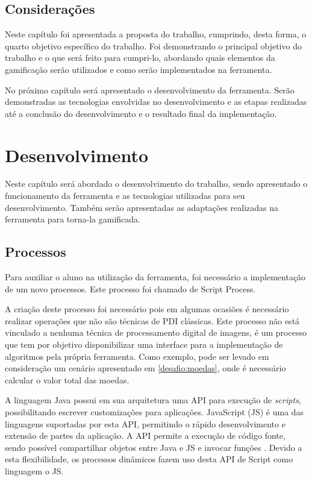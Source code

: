\documentclass[
	12pt,				%
	oneside,			%
	a4paper,			%
	english,			%
	french,				%
	spanish,			%
	brazil,				%
	]{abntex2}
\begin{document}
\section{Considerações}

Neste capítulo foi apresentada a proposta do trabalho, cumprindo, desta forma, o quarto objetivo específico do trabalho. Foi demonstrando o principal objetivo do trabalho e o que será feito para cumpri-lo, abordando quais elementos da gamificação serão utilizados e como serão implementados na ferramenta.

No próximo capítulo será apresentado o desenvolvimento da ferramenta. Serão demonstradas as tecnologias envolvidas no desenvolvimento e as etapas realizadas até a conclusão do desenvolvimento e o resultado final da implementação.

\chapter{Desenvolvimento} 


Neste capítulo será abordado o desenvolvimento do trabalho, sendo apresentado o funcionamento da ferramenta e as tecnologias utilizadas para seu desenvolvimento. Também serão apresentadas as adaptações realizadas na ferramenta para torna-la gamificada.

\section{Processos}
\label{sec:processos}

Para auxiliar o aluno na utilização da ferramenta, foi necessário a implementação de um novo processos. Este processo foi chamado de {Script Process}.

A criação deste processo foi necessário pois em algumas ocasiões é necessário realizar operações que não são técnicas de PDI clássicas. Este processo não está vinculado a nenhuma técnica de processamento digital de imagens, é um processo que tem por objetivo disponibilizar uma interface para a implementação de algoritmos pela própria ferramenta. Como exemplo, pode ser levado em consideração um cenário apresentado em \ref{desafio:moedas}, onde é necessário calcular o valor total das moedas.

A linguagem Java possui em sua arquitetura uma API para execução de \textit{scripts}, possibilitando escrever customizações para aplicações. JavaScript (JS) é uma das linguagens suportadas por esta API, permitindo o rápido desenvolvimento e extensão de partes da aplicação. A API permite a execução de código fonte, sendo possível compartilhar objetos entre Java e JS e invocar funções \cite{oracle}. Devido a esta flexibilidade, os processos dinâmicos fazem uso desta API de Script como linguagem o JS. 
\end{document}
